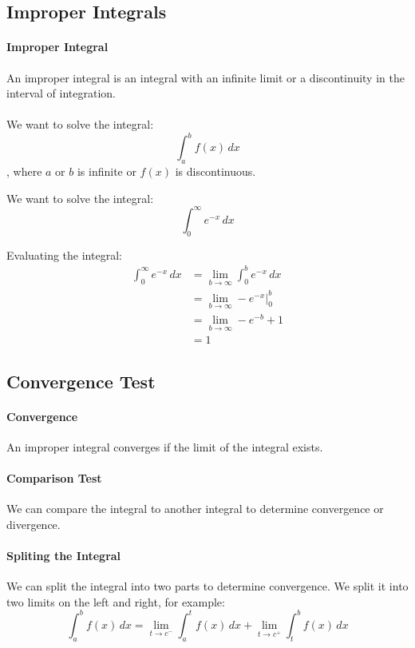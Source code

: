 \documentclass[11pt]{report}
\begin{document}
\subsection{Improper Integrals}
\paragraph{Improper Integral} An improper integral is an integral with an infinite limit or a discontinuity in the interval of integration.
\paragraph{} We want to solve the integral:
\begin{equation}
    \int_a^b f(x) \, dx
\end{equation}
, where $a$ or $b$ is infinite or $f(x)$ is discontinuous.
\begin{example}
We want to solve the integral:
$$ \int_0^\infty e^{-x} \, dx $$

Evaluating the integral:
\begin{align*}
    \int_0^\infty e^{-x} \, dx &= \lim_{b \to \infty} \int_0^b e^{-x} \, dx \\
    &= \lim_{b \to \infty} -e^{-x} \Big|_0^b \\
    &= \lim_{b \to \infty} -e^{-b} + 1 \\
    &= 1
\end{align*}
\end{example}
\subsection{Convergence Test}
\paragraph{Convergence} An improper integral converges if the limit of the integral exists. 
\paragraph{Comparison Test} We can compare the integral to another integral to determine convergence or divergence.
\paragraph{Spliting the Integral} We can split the integral into two parts to determine convergence. We split it into two limits on the left and right, for example:
$$ \int_a^b f(x)\, dx = \lim_{t \to c^-} \int_a^t f(x) \, dx + \lim_{t \to c^+} \int_t^b f(x) \, dx $$
\end{document}
